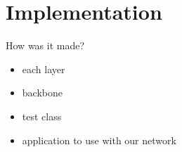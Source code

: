 \chapter{Implementation}
How was it made?

\begin{itemize}
\item each layer
\item backbone
\item test class
\item application to use with our network
\end{itemize}